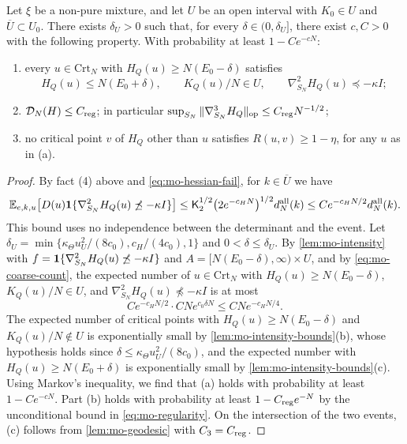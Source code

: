 \begin{proposition}\label{prop:mo-all-high}
Let $\xi$ be a non-pure mixture, and let $U$ be an open interval with $K_0\in U$ and $\overline U\subset U_0$. There exists $\delta_U>0$ such that, for every $\delta\in(0,\delta_U]$, there exist $c,C>0$ with the following property. With probability at least $1-Ce^{-cN}$:
\begin{enumerate}
\item[(a)] every $u\in\mathrm{Crt}_N$ with $H_Q(u)\ge N(E_0-\delta)$ satisfies
\begin{equation}\label{eq:mo-all-high}
H_Q(u)\le N(E_0+\delta),\qquad K_Q(u)/N\in U,\qquad\nabla_{S_N}^2H_Q(u)\preceq-\kappa I;
\end{equation}
\item[(b)] $\mathcal D_N(H)\le C_{\rm reg}$; in particular $\sup_{S_N}\|\nabla_{S_N}^3H_Q\|_{\rm op}\le C_{\rm reg}N^{-1/2}$;
\item[(c)] no critical point $v$ of $H_Q$ other than $u$ satisfies $R(u,v)\ge1-\eta$, for any $u$ as in (a).
\end{enumerate}
\end{proposition}

\begin{proof}
By fact (4) above and \eqref{eq:mo-hessian-fail}, for $k\in\overline U$ we have
\[
\mathbb E_{e,k,u}\bigl[D(u)\mathbf 1\{\nabla_{S_N}^2H_Q(u)\not\preceq-\kappa I\}\bigr]\le\mathsf K_2^{1/2}\bigl(2e^{-c_HN}\bigr)^{1/2}d_N^{\rm all}(k)\le Ce^{-c_HN/2}d_N^{\rm all}(k).
\]
This bound uses no independence between the determinant and the event. Let $\delta_U=\min\{\kappa_\Theta u_U^2/(8c_0),c_H/(4c_0),1\}$ and $0<\delta\le\delta_U$. By \cref{lem:mo-intensity} with $f=\mathbf 1\{\nabla_{S_N}^2H_Q(u)\not\preceq-\kappa I\}$ and $A=[N(E_0-\delta),\infty)\times U$, and by \eqref{eq:mo-coarse-count}, the expected number of $u\in\mathrm{Crt}_N$ with $H_Q(u)\ge N(E_0-\delta)$, $K_Q(u)/N\in U$, and $\nabla_{S_N}^2H_Q(u)\not\preceq-\kappa I$ is at most
\[
Ce^{-c_HN/2}\cdot CNe^{c_0\delta N}\le CNe^{-c_HN/4}.
\]
The expected number of critical points with $H_Q(u)\ge N(E_0-\delta)$ and $K_Q(u)/N\notin U$ is exponentially small by \cref{lem:mo-intensity-bounds}(b), whose hypothesis holds since $\delta\le\kappa_\Theta u_U^2/(8c_0)$, and the expected number with $H_Q(u)\ge N(E_0+\delta)$ is exponentially small by \cref{lem:mo-intensity-bounds}(c). Using Markov's inequality, we find that (a) holds with probability at least $1-Ce^{-cN}$. Part (b) holds with probability at least $1-C_{\rm reg}e^{-N}$ by the unconditional bound in \eqref{eq:mo-regularity}. On the intersection of the two events, (c) follows from \cref{lem:mo-geodesic} with $C_3=C_{\rm reg}$.
\end{proof}

